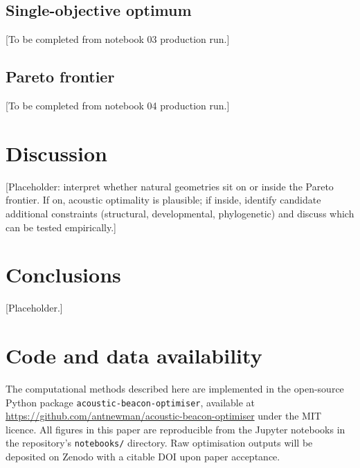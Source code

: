\documentclass[preprint,12pt]{elsarticle}
\begin{document}
\subsection{Single-objective optimum}

[To be completed from notebook 03 production run.]

\subsection{Pareto frontier}

[To be completed from notebook 04 production run.]

\section{Discussion}
\label{sec:discussion}

[Placeholder: interpret whether natural geometries sit on or inside the Pareto frontier. If on, acoustic optimality is plausible; if inside, identify candidate additional constraints (structural, developmental, phylogenetic) and discuss which can be tested empirically.]

\section{Conclusions}
\label{sec:conclusions}

[Placeholder.]

\section*{Code and data availability}

The computational methods described here are implemented in the open-source Python package \texttt{acoustic-beacon-optimiser}, available at \url{https://github.com/antnewman/acoustic-beacon-optimiser} under the MIT licence. All figures in this paper are reproducible from the Jupyter notebooks in the repository's \texttt{notebooks/} directory. Raw optimisation outputs will be deposited on Zenodo with a citable DOI upon paper acceptance.



\end{document}
